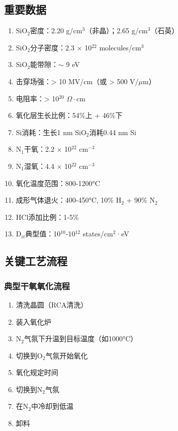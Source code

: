 \documentclass[UTF8,12pt,a4paper]{ctexart}
\begin{document}
\subsection{重要数据}

\begin{enumerate}
    \item SiO$_2$密度：2.20 g/cm$^3$（非晶）；2.65 g/cm$^3$（石英）
    \item SiO$_2$分子密度：2.3 $\times$ 10$^{22}$ molecules/cm$^3$
    \item SiO$_2$能带隙：$\sim$ 9 eV
    \item 击穿场强：> 10 MV/cm（或 > 500 V/$\mu$m）
    \item 电阻率：> 10$^{20}$ $\Omega \cdot$cm
    \item 氧化层生长比例：54\%上 + 46\%下
    \item Si消耗：生长1 nm SiO$_2$消耗0.44 nm Si
    \item N$_1$干氧：2.2 $\times$ 10$^{22}$ cm$^{-3}$
    \item N$_1$湿氧：4.4 $\times$ 10$^{22}$ cm$^{-3}$
    \item 氧化温度范围：800-1200°C
    \item 成形气体退火：400-450°C, 10\% H$_2$ + 90\% N$_2$
    \item HCl添加比例：1-5\%
    \item D$_{it}$典型值：10$^{10}$-10$^{12}$ states/cm$^2$·eV
\end{enumerate}

\subsection{关键工艺流程}

\subsubsection{典型干氧氧化流程}

\begin{enumerate}
    \item 清洗晶圆（RCA清洗）
    \item 装入氧化炉
    \item N$_2$气氛下升温到目标温度（如1000°C）
    \item 切换到O$_2$气氛开始氧化
    \item 氧化规定时间
    \item 切换到N$_2$气氛
    \item 在N$_2$中冷却到低温
    \item 卸料
\end{enumerate}
\end{document}
